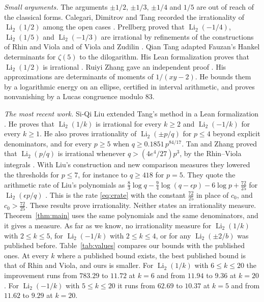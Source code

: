\documentclass[11pt]{amsart}
\theoremstyle{definition}
\theoremstyle{remark}
\numberwithin{equation}{section}
\newcommand{\Li}{\operatorname{Li}}
\begin{document}
\emph{Small arguments.} The arguments $\pm1/2$, $\pm1/3$, $\pm1/4$ and $1/5$ are out of reach of the
classical forms. Calegari, Dimitrov and Tang recorded the irrationality of $\Li_2(1/2)$ among the open cases
\cite[Remark~2.8.2 and \S15.2]{CDT2024}. Prellberg proved that $\Li_2(-1/4)$, $\Li_2(1/5)$ and $\Li_2(-1/3)$ are
irrational by refinements of the constructions of Rhin and Viola and of Viola and Zudilin \cite{Prellberg26}. Qian Tang
adapted Fauzan's Hankel determinants for $\zeta(5)$ \cite{Fauzan2026} to the dilogarithm. His Lean formalization proves
that $\Li_2(1/2)$ is irrational \cite{TangLi2}. Ruiyi Zhang gave an independent proof \cite{ZhangLi2Half}. His
approximations are determinants of moments of $1/(xy-2)$. He bounds them by a logarithmic energy on an ellipse,
certified in interval arithmetic, and proves nonvanishing by a Lucas congruence modulo $83$.

\emph{The most recent work.} Si-Qi Liu extended Tang's method in a Lean formalization \cite{LiuLi2Rational}. He
proves that $\Li_2(1/k)$ is irrational for every $k\ge2$ and $\Li_2(-1/k)$ for every $k\ge1$. He also proves
irrationality of $\Li_2(\pm p/q)$ for $p\le4$ beyond explicit denominators, and for every $p\ge5$ when
$q\ge0.1851\,p^{84/17}$. Tan and Zhang proved that $\Li_2(p/q)$ is irrational whenever $q>(4e^4/27)p^3$, by the
Rhin--Viola integrals \cite{TanZhang26}. With Liu's construction and new comparison measures they lowered the
thresholds for $p\le7$, for instance to $q\ge418$ for $p=5$. They quote the arithmetic rate of Liu's polynomials as
$\frac83\log q-\frac94\log(q-\epsilon p)-6\log p+\frac{72}{25}$ for $\Li_2(\epsilon p/q)$ \cite[(2.2)]{TanZhang26}. This
is the rate \eqref{eq:crate} with the constant $\frac{72}{25}$ in place of $c_0$, and $c_0>\frac{72}{25}$. These
results prove irrationality. Neither states an irrationality measure. Theorem~\ref{thm:main} uses the same polynomials
and the same denominators, and it gives a measure. As far as we know, no irrationality measure for $\Li_2(1/k)$ with
$2\le k\le5$, for $\Li_2(-1/k)$ with $2\le k\le4$, or for any $\Li_2(\pm2/b)$ was published before.
Table~\ref{tab:values} compares our bounds with the published ones. At every $k$ where a published bound exists, the
best published bound is that of Rhin and Viola, and ours is smaller. For $\Li_2(1/k)$ with $6\le k\le20$ the
improvement runs from $783.29$ to $11.72$ at $k=6$ and from $11.94$ to $9.36$ at $k=20$. For $\Li_2(-1/k)$ with
$5\le k\le20$ it runs from $62.69$ to $10.37$ at $k=5$ and from $11.62$ to $9.29$ at $k=20$.
\end{document}
